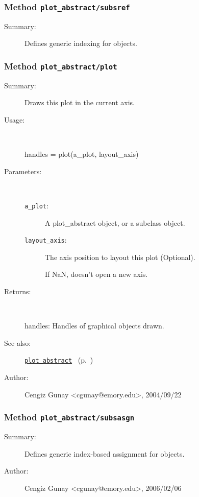 \subsubsection[Method \texttt{subsref}]{Method \texttt{plot\_abstract/subsref}}%
%
\label{ref_plot_abstract__subsref}%
\hypertarget{ref_plot_abstract__subsref}{}%
\begin{description}
\item[Summary:]Defines generic indexing for objects.
%
%
%
%
%
%
%
%
\end{description}
\methodline%
\subsubsection[Method \texttt{plot}]{Method \texttt{plot\_abstract/plot}}%
%
\label{ref_plot_abstract__plot}%
\hypertarget{ref_plot_abstract__plot}{}%
\begin{description}
\item[Summary:]Draws this plot in the current axis.
%
\item[Usage:]~%
\begin{lyxcode}%
handles = plot(a\_plot, layout\_axis)
%
\end{lyxcode}%
%
%
\item[Parameters:]~
\begin{description}%
\item[\texttt{a\_plot}:]
 A plot\_abstract object, or a subclass object.
\item[\texttt{layout\_axis}:]
 The axis position to layout this plot (Optional). 

If NaN, doesn't open a new axis.\end{description}%
%
\item[Returns:]~

	handles: Handles of graphical objects drawn.
%
%
\item[See also:]%
\hyperlink{ref_plot_abstract}{\texttt{plot\_abstract}}%
\ (p.~\pageref{ref_plot_abstract})%
%
%
\item[Author:]%
Cengiz Gunay <cgunay@emory.edu>, 2004/09/22%
\end{description}
\methodline%
\subsubsection[Method \texttt{subsasgn}]{Method \texttt{plot\_abstract/subsasgn}}%
%
\label{ref_plot_abstract__subsasgn}%
\hypertarget{ref_plot_abstract__subsasgn}{}%
\begin{description}
\item[Summary:]Defines generic index-based assignment for objects.
%
%
%
%
%
%
%
\item[Author:]%
Cengiz Gunay <cgunay@emory.edu>, 2006/02/06%
\end{description}
\methodline%
